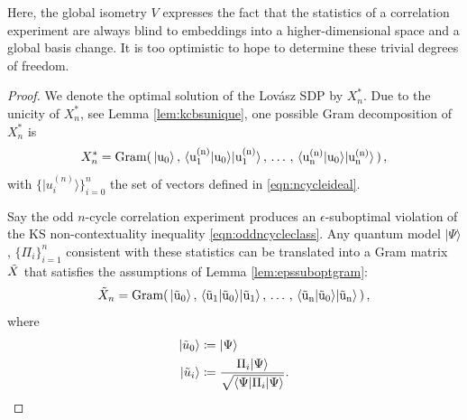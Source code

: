 Here, the global isometry $V$ expresses the fact that the statistics of a correlation experiment are always blind to embeddings into a higher-dimensional space and a global basis change. It is too optimistic to hope to determine these trivial degrees of freedom. 

\begin{proof} We denote the optimal solution of the Lovász SDP by $X^*_n$. Due to the unicity of $X_n^*$, see Lemma \ref{lem:kcbsunique}, one possible Gram decomposition of $X^*_n$ is
\begin{equation*}
X^*_n=\operatorname{Gram(\thinspace\vert u_0\rangle\thinspace,\thinspace \langle u_1^{(n)}\vert u_0 \rangle \vert u_1^{(n)}\rangle\thinspace,\thinspace \dots\thinspace,\thinspace \langle u_n^{(n)}\vert u_0\rangle \vert u_n^{(n)}\rangle\thinspace)}\thinspace,
\end{equation*}
with $\{\vert u_i^{(n)} \rangle \}_{i=0}^n$ the set of vectors defined in \ref{eqn:ncycleideal}.

Say the odd $n$-cycle correlation experiment produces an $\epsilon$-suboptimal violation of the KS non-contextuality inequality \ref{eqn:oddncycleclass}. Any quantum model $\vert \Psi \rangle$, $\{\Pi_i\}_{i=1}^n$ consistent with these statistics can be translated into a Gram matrix $\Tilde{X}$ that satisfies the assumptions of Lemma \ref{lem:epssuboptgram}:
\begin{equation*}
\Tilde{X}_n=\operatorname{Gram(\thinspace\vert \Tilde{u}_0\rangle\thinspace,\thinspace \langle \Tilde{u}_1\vert \Tilde{u}_0 \rangle \vert \Tilde{u}_1\rangle\thinspace,\thinspace \dots\thinspace,\thinspace \langle \Tilde{u}_n\vert \Tilde{u}_0\rangle \vert \Tilde{u}_n\rangle\thinspace)}\thinspace,
\end{equation*}
where 
\begin{align*}
    \vert \Tilde{u}_0 \rangle & \coloneqq \vert \Psi \rangle\\
    \vert  \Tilde{u}_i \rangle & \coloneqq \frac{\Pi_i \vert \Psi \rangle}{\sqrt{\langle \Psi \vert \Pi_i \vert \Psi \rangle}}.
\end{align*}


\end{proof}
